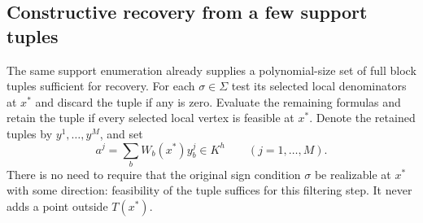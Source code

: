 \subsection{Constructive recovery from a few support tuples}\label{app:core-recovery}

The same support enumeration already supplies a polynomial-size set of
full block tuples sufficient for recovery. For each $\sigma\in\Sigma$
test its selected local denominators at $x^*$ and discard the tuple
if any is zero. Evaluate the remaining formulas and retain the tuple
if every selected local vertex is feasible at $x^*$. Denote the retained tuples by $y^1,\ldots,y^M$, and set
\[
              a^j=\sum_b W_b(x^*)y_b^j\in K^h\qquad(j=1,\ldots,M).
\]
There is no need to require that the original sign condition $\sigma$
be realizable at $x^*$ with some direction: feasibility of the tuple
suffices for this filtering step. It never adds a point outside $T(x^*)$.


